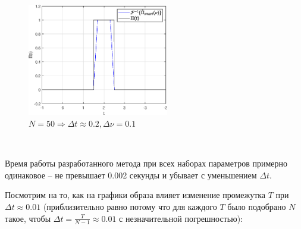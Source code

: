 \documentclass[a4paper]{article}
\begin{document}
\begin{figure}[H]
    \centering \includegraphics[width=0.55\textwidth]{graphs/3/T_10_dt_0.20408_V_5_dv_0.1/func_inversed_smart.eps}
    \caption{$N = 50 \Rightarrow \Delta t \approx 0.2, \Delta \nu = 0.1$}
\end{figure}\noindent\

Время работы разработанного метода при всех наборах параметров примерно одинаковое -- не превышает 0.002 секунды и убывает с уменьшением $\Delta t$.

Посмотрим на то, как на графики образа влияет изменение промежутка $T$ при $\Delta t \approx 0.01$ (приблизительно равно потому что для каждого $T$ было подобрано $N$ такое, чтобы $\Delta t = \frac{T}{N-1} \approx 0.01$ с незначительной погрешностью):
\end{document}
